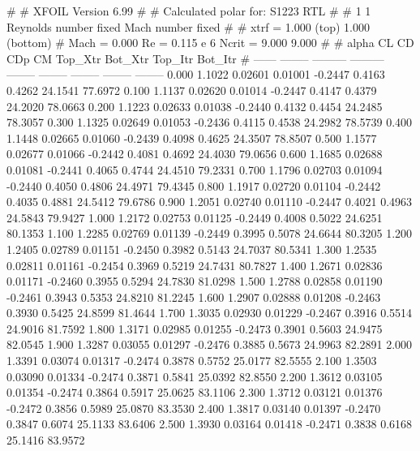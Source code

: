 #  
#       XFOIL         Version 6.99
#  
# Calculated polar for: S1223 RTL                                       
#  
# 1 1 Reynolds number fixed          Mach number fixed         
#  
# xtrf =   1.000 (top)        1.000 (bottom)  
# Mach =   0.000     Re =     0.115 e 6     Ncrit =   9.000  9.000
#  
#   alpha    CL        CD       CDp       CM     Top_Xtr  Bot_Xtr  Top_Itr  Bot_Itr
#  ------ -------- --------- --------- -------- -------- -------- -------- --------
   0.000   1.1022   0.02601   0.01001  -0.2447   0.4163   0.4262  24.1541  77.6972
   0.100   1.1137   0.02620   0.01014  -0.2447   0.4147   0.4379  24.2020  78.0663
   0.200   1.1223   0.02633   0.01038  -0.2440   0.4132   0.4454  24.2485  78.3057
   0.300   1.1325   0.02649   0.01053  -0.2436   0.4115   0.4538  24.2982  78.5739
   0.400   1.1448   0.02665   0.01060  -0.2439   0.4098   0.4625  24.3507  78.8507
   0.500   1.1577   0.02677   0.01066  -0.2442   0.4081   0.4692  24.4030  79.0656
   0.600   1.1685   0.02688   0.01081  -0.2441   0.4065   0.4744  24.4510  79.2331
   0.700   1.1796   0.02703   0.01094  -0.2440   0.4050   0.4806  24.4971  79.4345
   0.800   1.1917   0.02720   0.01104  -0.2442   0.4035   0.4881  24.5412  79.6786
   0.900   1.2051   0.02740   0.01110  -0.2447   0.4021   0.4963  24.5843  79.9427
   1.000   1.2172   0.02753   0.01125  -0.2449   0.4008   0.5022  24.6251  80.1353
   1.100   1.2285   0.02769   0.01139  -0.2449   0.3995   0.5078  24.6644  80.3205
   1.200   1.2405   0.02789   0.01151  -0.2450   0.3982   0.5143  24.7037  80.5341
   1.300   1.2535   0.02811   0.01161  -0.2454   0.3969   0.5219  24.7431  80.7827
   1.400   1.2671   0.02836   0.01171  -0.2460   0.3955   0.5294  24.7830  81.0298
   1.500   1.2788   0.02858   0.01190  -0.2461   0.3943   0.5353  24.8210  81.2245
   1.600   1.2907   0.02888   0.01208  -0.2463   0.3930   0.5425  24.8599  81.4644
   1.700   1.3035   0.02930   0.01229  -0.2467   0.3916   0.5514  24.9016  81.7592
   1.800   1.3171   0.02985   0.01255  -0.2473   0.3901   0.5603  24.9475  82.0545
   1.900   1.3287   0.03055   0.01297  -0.2476   0.3885   0.5673  24.9963  82.2891
   2.000   1.3391   0.03074   0.01317  -0.2474   0.3878   0.5752  25.0177  82.5555
   2.100   1.3503   0.03090   0.01334  -0.2474   0.3871   0.5841  25.0392  82.8550
   2.200   1.3612   0.03105   0.01354  -0.2474   0.3864   0.5917  25.0625  83.1106
   2.300   1.3712   0.03121   0.01376  -0.2472   0.3856   0.5989  25.0870  83.3530
   2.400   1.3817   0.03140   0.01397  -0.2470   0.3847   0.6074  25.1133  83.6406
   2.500   1.3930   0.03164   0.01418  -0.2471   0.3838   0.6168  25.1416  83.9572
